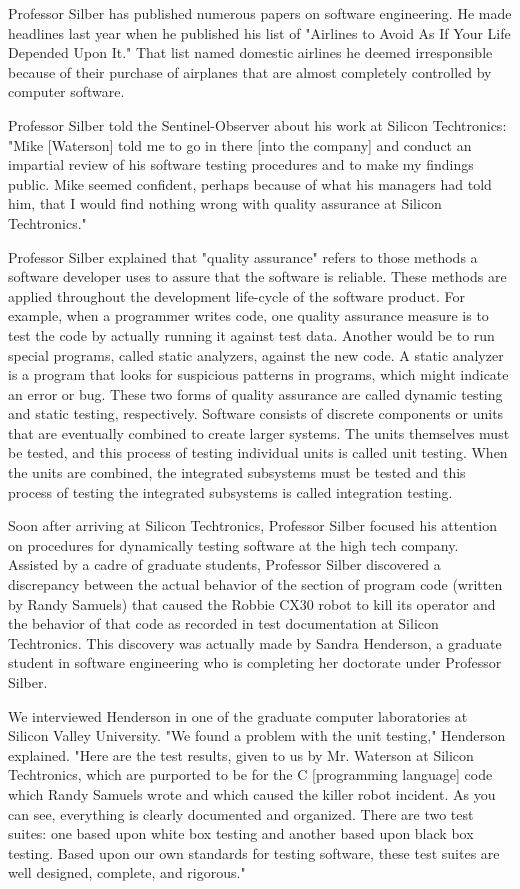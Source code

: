 Professor Silber has published numerous papers on software engineering. He made headlines last year when he published his list of "Airlines to Avoid As If Your Life Depended Upon It." That list named domestic airlines he deemed irresponsible because of their purchase of airplanes that are almost completely controlled by computer software.

Professor Silber told the Sentinel-Observer about his work at Silicon Techtronics: "Mike [Waterson] told me to go in there [into the company] and conduct an impartial review of his software testing procedures and to make my findings public. Mike seemed confident, perhaps because of what his managers had told him, that I would find nothing wrong with quality assurance at Silicon Techtronics."

Professor Silber explained that "quality assurance" refers to those methods a software developer uses to assure that the software is reliable. These methods are applied throughout the development life-cycle of the software product. For example, when a programmer writes code, one quality assurance measure is to test the code by actually running it against test data. Another would be to run special programs, called static analyzers, against the new code. A static analyzer is a program that looks for suspicious patterns in programs, which might indicate an error or bug. These two forms of quality assurance are called dynamic testing and static testing, respectively. Software consists of discrete components or units that are eventually combined to create larger systems. The units themselves must be tested, and this process of testing individual units is called unit testing. When the units are combined, the integrated subsystems must be tested and this process of testing the integrated subsystems is called integration testing.

Soon after arriving at Silicon Techtronics, Professor Silber focused his attention on procedures for dynamically testing software at the high tech company. Assisted by a cadre of graduate students, Professor Silber discovered a discrepancy between the actual behavior of the section of program code (written by Randy Samuels) that caused the Robbie CX30 robot to kill its operator and the behavior of that code as recorded in test documentation at Silicon Techtronics. This discovery was actually made by Sandra Henderson, a graduate student in software engineering who is completing her doctorate under Professor Silber.

We interviewed Henderson in one of the graduate computer laboratories at Silicon Valley University. "We found a problem with the unit testing," Henderson explained. "Here are the test results, given to us by Mr. Waterson at Silicon Techtronics, which are purported to be for the C [programming language] code which Randy Samuels wrote and which caused the killer robot incident. As you can see, everything is clearly documented and organized. There are two test suites: one based upon white box testing and another based upon black box testing. Based upon our own standards for testing software, these test suites are well designed, complete, and rigorous."

